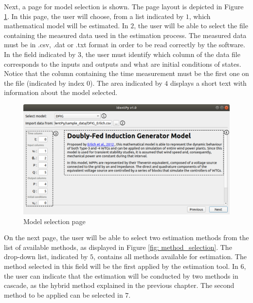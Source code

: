 Next, a page for model selection is shown. The page layout is depicted in Figure \ref{fig: model_selection}. In this page, the user will choose, from a list indicated by $1$, which mathematical model will be estimated. In $2$, the user will be able to select the file containing the measured data used in the estimation process. The measured data must be in .csv, .dat or .txt format in order to be read correctly by the software. In the field indicated by $3$, the user must identify which column of the data file corresponds to the inputs and outputs and what are initial conditions of states. Notice that the column containing the time measurement must be the first one on the file (indicated by index $0$). The area indicated by $4$ displays a short text with information about the model selected.

\begin{figure}[!h]
	\caption{Model selection page}
	\begin{center}
		\includegraphics[scale=.5]{Images/Software_model_page.eps}
	\end{center}
	\label{fig: model_selection}
\end{figure}

On the next page, the user will be able to select two estimation methods from the list of available methods, as displayed in Figure \ref{fig: method_selection}. The drop-down list, indicated by $5$, contains all methods available for estimation. The method selected in this field will be the first applied by the estimation tool. In $6$, the user can indicate that the estimation will be conducted by two methods in cascade, as the hybrid method explained in the previous chapter. The second method to be applied can be selected in $7$.

